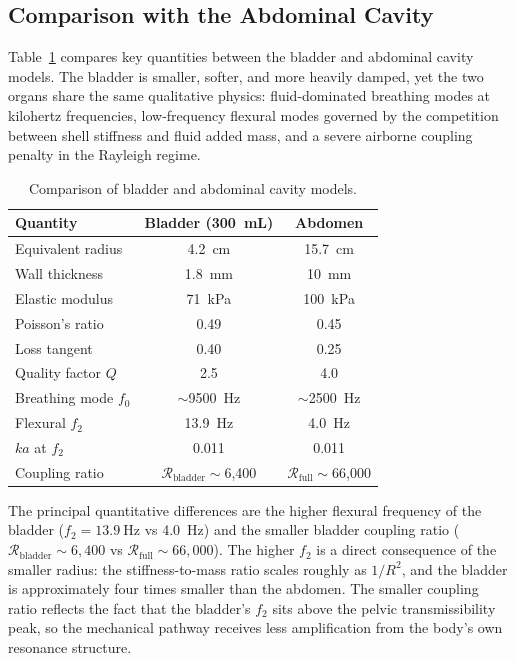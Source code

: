 \subsection{Comparison with the Abdominal Cavity}
\label{sec:comparison}

Table~\ref{tab:comparison} compares key quantities between the bladder and
abdominal cavity models.  The bladder is smaller, softer, and more heavily
damped, yet the two organs share the same qualitative physics: fluid-dominated
breathing modes at kilohertz frequencies, low-frequency flexural modes
governed by the competition between shell stiffness and fluid added mass, and
a severe airborne coupling penalty in the Rayleigh regime.

\begin{table}[htbp]
  \centering
  \caption{Comparison of bladder and abdominal cavity models.}
  \label{tab:comparison}
  \begin{tabular}{lcc}
    \toprule
    Quantity & Bladder (300~mL) & Abdomen \\
    \midrule
    Equivalent radius & \SI{4.2}{\centi\metre} & \SI{15.7}{\centi\metre} \\
    Wall thickness & \SI{1.8}{\milli\metre} & \SI{10}{\milli\metre} \\
    Elastic modulus & \SI{71}{\kilo\pascal} & \SI{100}{\kilo\pascal} \\
    Poisson's ratio & 0.49 & 0.45 \\
    Loss tangent & 0.40 & 0.25 \\
    Quality factor $Q$ & 2.5 & 4.0 \\
    Breathing mode $f_0$ & $\sim$\SI{9500}{\hertz} & $\sim$\SI{2500}{\hertz} \\
    Flexural $f_2$ & \SI{13.9}{\hertz} & \SI{4.0}{\hertz} \\
    $ka$ at $f_2$ & 0.011 & 0.011 \\
    Coupling ratio & $\mathcal{R}_\mathrm{bladder} \sim$6,400 & $\mathcal{R}_\mathrm{full} \sim$66,000 \\
    \bottomrule
  \end{tabular}
\end{table}

The principal quantitative differences are the higher flexural frequency of
the bladder ($f_2 = \SI{13.9}{\hertz}$ vs \SI{4.0}{\hertz}) and the smaller
bladder coupling ratio ($\mathcal{R}_\mathrm{bladder} \sim 6{,}400$ vs
$\mathcal{R}_\mathrm{full} \sim 66{,}000$).  The higher $f_2$ is a direct
consequence of the smaller radius: the stiffness-to-mass ratio scales
roughly as $1/R^2$, and the bladder is approximately four times smaller
than the abdomen.  The smaller coupling ratio reflects the fact that the
bladder's $f_2$ sits above the pelvic transmissibility peak, so the
mechanical pathway receives less amplification from the body's own
resonance structure.
